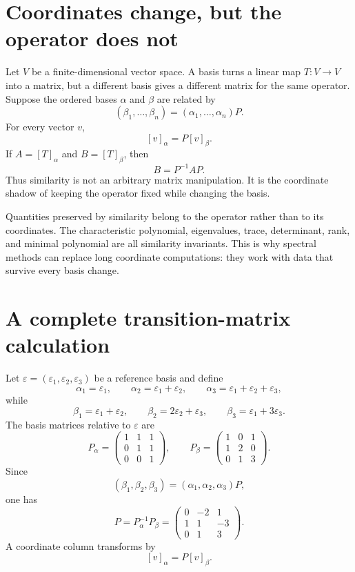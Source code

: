 
\section{Coordinates change, but the operator does not}

Let \(V\) be a finite-dimensional vector space.  A basis turns a linear map \(T:V\to V\) into a matrix, but a different basis gives a different matrix for the same operator.  Suppose the ordered bases \(\alpha\) and \(\beta\) are related by
\[
  (\beta_1,\ldots,\beta_n)
  =(\alpha_1,\ldots,\alpha_n)P.
\]
For every vector \(v\),
\[
  [v]_\alpha=P[v]_\beta.
\]
If \(A=[T]_\alpha\) and \(B=[T]_\beta\), then
\[
  B=P^{-1}AP.
\]
Thus similarity is not an arbitrary matrix manipulation.  It is the coordinate shadow of keeping the operator fixed while changing the basis.

Quantities preserved by similarity belong to the operator rather than to its coordinates.  The characteristic polynomial, eigenvalues, trace, determinant, rank, and minimal polynomial are all similarity invariants.  This is why spectral methods can replace long coordinate computations: they work with data that survive every basis change.

\section{A complete transition-matrix calculation}

Let \(\varepsilon=(\varepsilon_1,\varepsilon_2,\varepsilon_3)\) be a reference basis and define
\[
  \alpha_1=\varepsilon_1,
  \qquad
  \alpha_2=\varepsilon_1+\varepsilon_2,
  \qquad
  \alpha_3=\varepsilon_1+\varepsilon_2+\varepsilon_3,
\]
while
\[
  \beta_1=\varepsilon_1+\varepsilon_2,
  \qquad
  \beta_2=2\varepsilon_2+\varepsilon_3,
  \qquad
  \beta_3=\varepsilon_1+3\varepsilon_3.
\]
The basis matrices relative to \(\varepsilon\) are
\[
  P_\alpha=
  \begin{pmatrix}
    1&1&1\\
    0&1&1\\
    0&0&1
  \end{pmatrix},
  \qquad
  P_\beta=
  \begin{pmatrix}
    1&0&1\\
    1&2&0\\
    0&1&3
  \end{pmatrix}.
\]
Since
\[
  (\beta_1,\beta_2,\beta_3)
  =(\alpha_1,\alpha_2,\alpha_3)P,
\]
one has
\[
  P=P_\alpha^{-1}P_\beta
  =
  \begin{pmatrix}
    0&-2&1\\
    1&1&-3\\
    0&1&3
  \end{pmatrix}.
\]
A coordinate column transforms by
\[
  [v]_\alpha=P[v]_\beta.
\]

